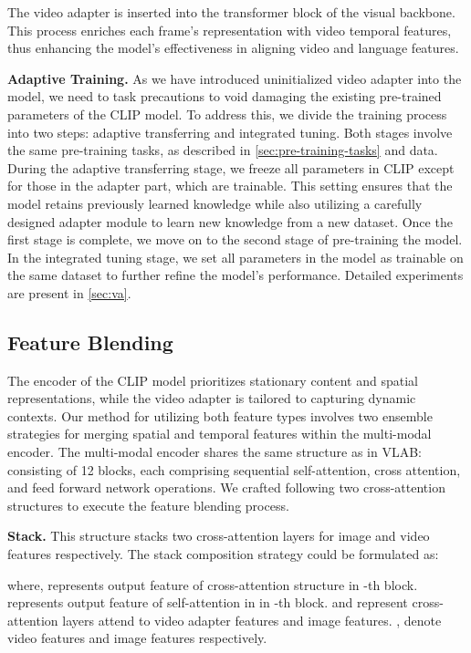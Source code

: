\documentclass{article}
\begin{document}
The video adapter is inserted into the transformer block of the visual backbone. This process enriches each frame’s representation with video temporal features, thus enhancing the model’s effectiveness in aligning video and language features.

\noindent\textbf{Adaptive Training.}
As we have introduced uninitialized video adapter into the model, we need to task precautions to void damaging the existing pre-trained parameters of the CLIP model. To address this, we divide the training process into two steps: adaptive transferring and integrated tuning. Both stages involve the same pre-training tasks, as described in \cref{sec:pre-training-tasks} and data.
During the adaptive transferring stage, we freeze all parameters in CLIP except for those in the adapter part, which are trainable. This setting ensures that the model retains previously learned knowledge while also utilizing a carefully designed adapter module to learn new knowledge from a new dataset.
Once the first stage is complete, we move on to the second stage of pre-training the model. In the integrated tuning stage, we set all parameters in the model as trainable on the same dataset to further refine the model's performance. Detailed experiments are present in \cref{sec:va}.

\subsection{Feature Blending}
\label{sec:ensemble}

The encoder of the CLIP model prioritizes stationary content and spatial representations, while the video adapter is tailored to capturing dynamic contexts. Our method for utilizing both feature types involves two ensemble strategies for merging spatial and temporal features within the multi-modal encoder. The multi-modal encoder shares the same structure as in VLAB: consisting of 12 blocks, each comprising sequential self-attention, cross attention, and feed forward network operations. We crafted following two cross-attention structures to execute the feature blending process.

\textbf{Stack.} This structure stacks two cross-attention layers for image and video features respectively. The stack composition strategy could be formulated as:

where,  represents output feature of cross-attention structure in -th block.  represents output feature of self-attention in in -th block.  and  represent cross-attention layers attend to video adapter features and image features. , denote video features and image features respectively.
\end{document}
